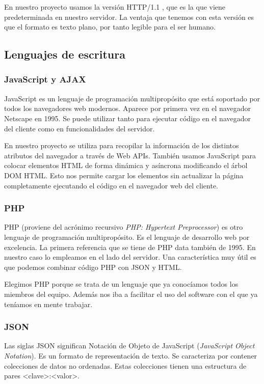 En nuestro proyecto usamos la versión HTTP/1.1 , que es la que viene predeterminada en nuestro servidor. La ventaja que tenemos con esta versión es que el formato es texto plano, por tanto legible para el ser humano. \par

\subsection{Lenguajes de escritura}

\subsubsection{JavaScript y AJAX}
JavaScript es un lenguaje de programación multipropósito que está soportado por todos los navegadores web modernos. Aparece por primera vez en el navegador Netscape en 1995. Se puede utilizar tanto para ejecutar código en el navegador del cliente como en funcionalidades del servidor. \par

En nuestro proyecto se utiliza para recopilar la información de los distintos atributos del navegador a través de Web APIs. También usamos JavaScript para  colocar elementos HTML de forma dinámica y asíncrona modificando el árbol DOM HTML. Esto nos permite cargar los elementos sin actualizar la página completamente ejecutando el código en el navegador web del cliente.\par

\subsubsection{PHP}

PHP (proviene del acrónimo recursivo \textit{PHP: Hypertext Preprocessor}) es otro lenguaje de programación multipropósito. Es el lenguaje de desarrollo web por excelencia. La primera referencia que se tiene de PHP data también de 1995. En nuestro caso lo empleamos en el lado del servidor. Una característica muy útil es que podemos combinar código PHP con JSON y HTML. \par 

Elegimos PHP porque se trata de un lenguaje que ya conocíamos todos los miembros del equipo. Además nos iba a facilitar el uso del software con el que ya teníamos en mente trabajar. \par 

\subsubsection{JSON}
Las siglas JSON significan Notación de Objeto de JavaScript (\textit{JavaScript Object Notation}). Es un formato de representación de texto. Se caracteriza por contener colecciones de datos no ordenadas. Estas colecciones tienen una estructura de pares <clave>:<valor>.\par

